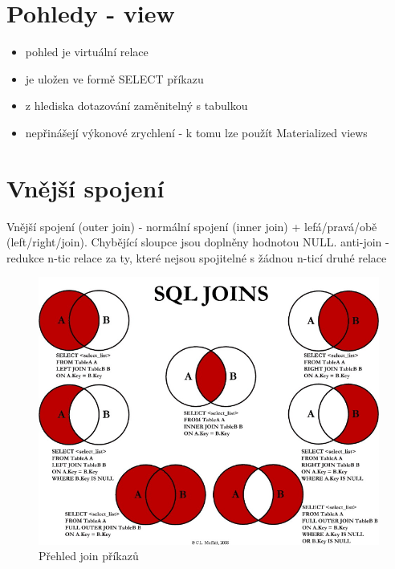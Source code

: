 \documentclass{szzclass}
\begin{document}
\section{Pohledy - view}
\begin{itemize}
    \item pohled je virtuální relace
    \item je uložen ve formě SELECT příkazu
    \item z hlediska dotazování zaměnitelný s tabulkou
    \item nepřinášejí výkonové zrychlení - k tomu lze použít Materialized views
\end{itemize}

\section{Vnější spojení}
Vnější spojení (outer join) - normální spojení (inner join) + lefá/pravá/obě (left/right/join). Chybějící sloupce jsou doplněny
hodnotou NULL.
\newline
anti-join - redukce n-tic relace za ty, které nejsou spojitelné s žádnou n-ticí druhé relace
\begin{figure}[h!]
    \centering
    \includegraphics[width = 1 \textwidth]{topics/bi-wsi-si-04/images/sqlJoin.png}
    \caption{Přehled join příkazů}
\end{figure}
\end{document}
